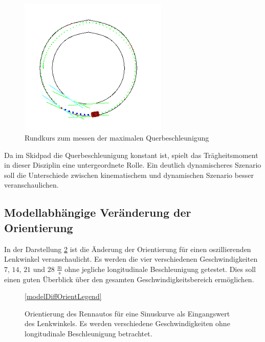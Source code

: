 \documentclass{like}
\begin{document}
\begin{figure}
	\centering
	\includegraphics[width=200pt]{Abbildungen/roundCourse.png}
	\caption{Rundkurs zum messen der maximalen Querbeschleunigung}
	\label{fig:roundCourse}
\end{figure}

Da im Skidpad die Querbeschleunigung konstant ist, spielt das Trägheitsmoment in dieser Disziplin eine untergeordnete Rolle.
Ein deutlich dynamischeres Szenario soll die Unterschiede zwischen kinematischem und dynamischen Szenario besser veranschaulichen.

\subsection{Modellabhängige Veränderung der Orientierung}
In der Darstellung \ref{fig:modelDiffOrient} ist die Änderung der Orientierung für einen oszillierenden Lenkwinkel veranschaulicht. Es werden die vier verschiedenen Geschwindigkeiten $7$, $14$, $21$ und $28$ $\frac{\text{m}}{\text{s}}$ ohne jegliche longitudinale Beschleunigung getestet. Dies soll einen guten Überblick über den gesamten Geschwindigkeitsbereich ermöglichen.

\begin{figure}
	\centering
	\subfigure{
		 
	}%
	\subfigure{
		 
	}	
	
	\ref{modelDiffOrientLegend}
	\caption{Orientierung des Rennautos für eine Sinuskurve als Eingangswert des Lenkwinkels. Es werden verschiedene Geschwindigkeiten ohne longitudinale Beschleunigung betrachtet.}\label{fig:modelDiffOrient}
\end{figure}
\end{document}
